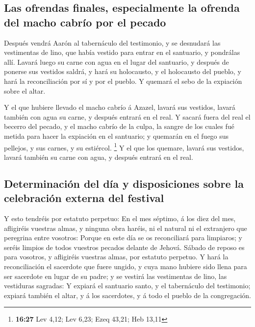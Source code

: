 \hypertarget{las-ofrendas-finales-especialmente-la-ofrenda-del-macho-cabruxedo-por-el-pecado}{%
\subsection{Las ofrendas finales, especialmente la ofrenda del macho
cabrío por el
pecado}\label{las-ofrendas-finales-especialmente-la-ofrenda-del-macho-cabruxedo-por-el-pecado}}

 Después vendrá Aarón al tabernáculo del testimonio, y se
desnudará las vestimentas de lino, que había vestido para entrar en el
santuario, y pondrálas allí.  Lavará luego su carne con
agua en el lugar del santuario, y después de ponerse sus vestidos
saldrá, y hará su holocausto, y el holocausto del pueblo, y hará la
reconciliación por sí y por el pueblo.  Y quemará el sebo
de la expiación sobre el altar.

 Y el que hubiere llevado el macho cabrío á Azazel, lavará
sus vestidos, lavará también con agua su carne, y después entrará en el
real.  Y sacará fuera del real el becerro del pecado, y el
macho cabrío de la culpa, la sangre de los cuales fué metida para hacer
la expiación en el santuario; y quemarán en el fuego sus pellejos, y sus
carnes, y su estiércol. \footnote{\textbf{16:27} Lev 4,12; Lev 6,23;
  Ezeq 43,21; Heb 13,11}  Y el que los quemare, lavará sus
vestidos, lavará también su carne con agua, y después entrará en el
real.

\hypertarget{determinaciuxf3n-del-duxeda-y-disposiciones-sobre-la-celebraciuxf3n-externa-del-festival}{%
\subsection{Determinación del día y disposiciones sobre la celebración
externa del
festival}\label{determinaciuxf3n-del-duxeda-y-disposiciones-sobre-la-celebraciuxf3n-externa-del-festival}}

 Y esto tendréis por estatuto perpetuo: En el mes séptimo,
á los diez del mes, afligiréis vuestras almas, y ninguna obra haréis, ni
el natural ni el extranjero que peregrina entre vosotros: 
Porque en este día se os reconciliará para limpiaros; y seréis limpios
de todos vuestros pecados delante de Jehová.  Sábado de
reposo es para vosotros, y afligiréis vuestras almas, por estatuto
perpetuo.  Y hará la reconciliación el sacerdote que fuere
ungido, y cuya mano hubiere sido llena para ser sacerdote en lugar de su
padre; y se vestirá las vestimentas de lino, las vestiduras sagradas:
 Y expiará el santuario santo, y el tabernáculo del
testimonio; expiará también el altar, y á los sacerdotes, y á todo el
pueblo de la congregación.

